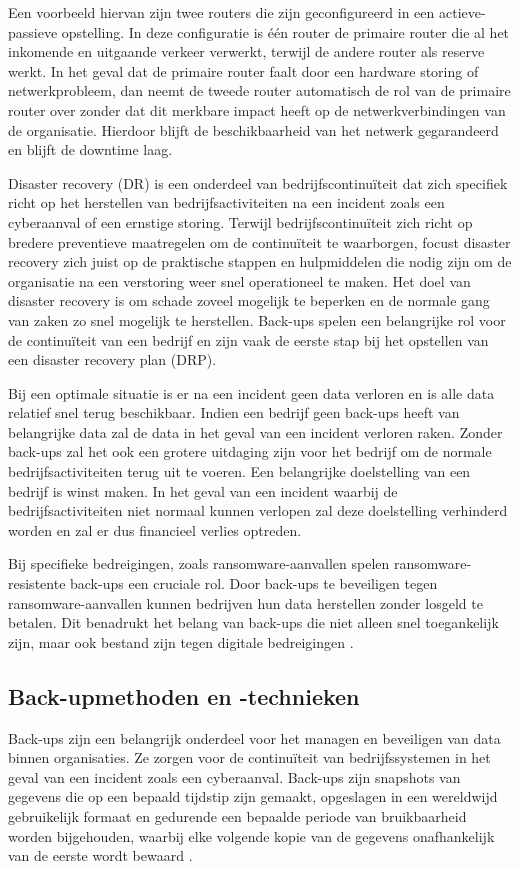 Een voorbeeld hiervan zijn twee routers die zijn geconfigureerd in een actieve-passieve opstelling. In deze configuratie is één router de primaire router die al het inkomende en uitgaande verkeer verwerkt, terwijl de andere router als reserve werkt. In het geval dat de primaire router faalt door een hardware storing of netwerkprobleem, dan neemt de tweede router automatisch de rol van de primaire router over zonder dat dit merkbare impact heeft op de netwerkverbindingen van de organisatie. Hierdoor blijft de beschikbaarheid van het netwerk gegarandeerd en blijft de downtime laag. 

Disaster recovery (DR) is een onderdeel van bedrijfscontinuïteit dat zich specifiek richt op het herstellen van bedrijfsactiviteiten na een incident zoals een cyberaanval of een ernstige storing. Terwijl bedrijfscontinuïteit zich richt op bredere preventieve maatregelen om de continuïteit te waarborgen, focust disaster recovery zich juist op de praktische stappen en hulpmiddelen die nodig zijn om de organisatie na een verstoring weer snel operationeel te maken. Het doel van disaster recovery is om schade zoveel mogelijk te beperken en de normale gang van zaken zo snel mogelijk te herstellen. Back-ups spelen een belangrijke rol voor de continuïteit van een bedrijf en zijn vaak de eerste stap bij het opstellen van een disaster recovery plan (DRP). 

Bij een optimale situatie is er na een incident geen data verloren en is alle data relatief snel terug beschikbaar. Indien een bedrijf geen back-ups heeft van belangrijke data zal de data in het geval van een incident verloren raken. Zonder back-ups zal het ook een grotere uitdaging zijn voor het bedrijf om de normale bedrijfsactiviteiten terug uit te voeren. Een belangrijke doelstelling van een bedrijf is winst maken. In het geval van een incident waarbij de bedrijfsactiviteiten niet normaal kunnen verlopen zal deze doelstelling verhinderd worden en zal er dus financieel verlies optreden. 

Bij specifieke bedreigingen, zoals ransomware-aanvallen spelen ransomware-resistente back-ups een cruciale rol. Door back-ups te beveiligen tegen ransomware-aanvallen kunnen bedrijven hun data herstellen zonder losgeld te betalen. Dit benadrukt het belang van back-ups die niet alleen snel toegankelijk zijn, maar ook bestand zijn tegen digitale bedreigingen \autocite{Ghazi2013}.

\subsection{Back-upmethoden en -technieken}
Back-ups zijn een belangrijk onderdeel voor het managen en beveiligen van data binnen organisaties. Ze zorgen voor de continuïteit van bedrijfssystemen in het geval van een incident zoals een cyberaanval. Back-ups zijn snapshots van gegevens die op een bepaald tijdstip zijn gemaakt, opgeslagen in een wereldwijd gebruikelijk formaat en gedurende een bepaalde periode van bruikbaarheid worden bijgehouden, waarbij elke volgende kopie van de gegevens onafhankelijk van de eerste wordt bewaard \autocite{Nelson2011}. 

